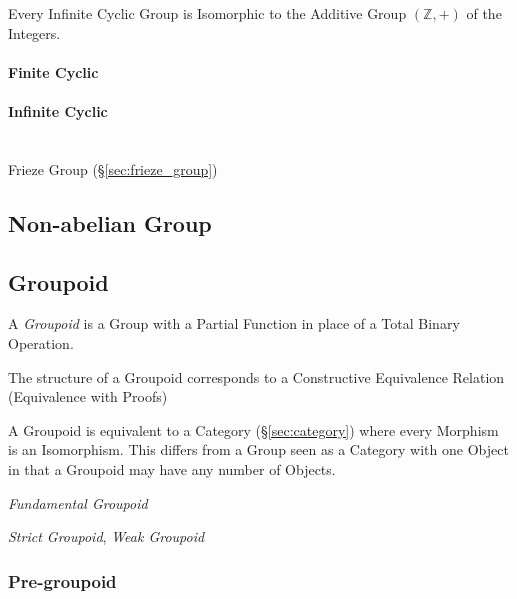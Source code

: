 Every Infinite Cyclic Group is Isomorphic to the Additive Group
$(\mathbb{Z}, +)$ of the Integers.



\paragraph{Finite Cyclic}\label{sec:finite_cyclic}

\paragraph{Infinite Cyclic}\label{sec:infinite_cyclic}
\hfill \\

Frieze Group (\S\ref{sec:frieze_group})



\subsection{Non-abelian Group}\label{sec:nonabelian_group}

\subsection{Groupoid}\label{sec:groupoid}

A \emph{Groupoid} is a Group with a Partial Function in place of a
Total Binary Operation.

The structure of a Groupoid corresponds to a Constructive Equivalence
Relation (Equivalence with Proofs)

A Groupoid is equivalent to a Category (\S\ref{sec:category}) where
every Morphism is an Isomorphism. This differs from a Group seen as a
Category with one Object in that a Groupoid may have any number of
Objects.

\emph{Fundamental Groupoid}

\emph{Strict Groupoid}, \emph{Weak Groupoid}



\subsubsection{Pre-groupoid}\label{sec:pre_groupoid}

